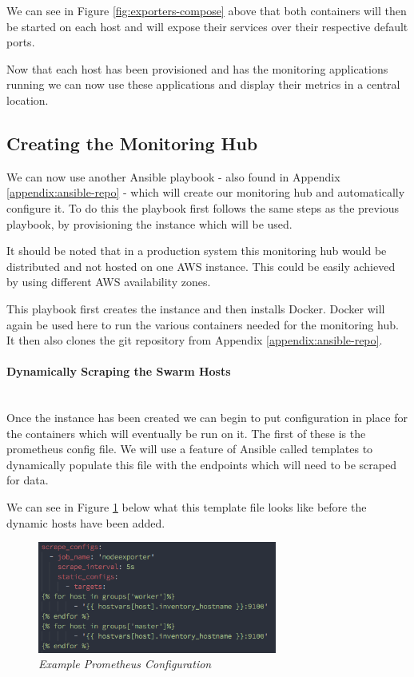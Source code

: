 We can see in Figure \ref{fig:exporters-compose} above that both containers will then be started on each host and will expose their services over their respective default ports.

Now that each host has been provisioned and has the monitoring applications running we can now use these applications and display their metrics in a central location.

\subsection{Creating the Monitoring Hub}
\label{sub:hub}
We can now use another Ansible playbook - also found in Appendix \ref{appendix:ansible-repo} - which will create our monitoring hub and automatically configure it. To do this the playbook first follows the same steps as the previous playbook, by provisioning the instance which will be used. 

It should be noted that in a production system this monitoring hub would be distributed and not hosted on one AWS instance. This could be easily achieved by using different AWS availability zones.

This playbook first creates the instance and then installs Docker. Docker will again be used here to run the various containers needed for the monitoring hub. It then also clones the git repository from Appendix \ref{appendix:ansible-repo}.

\paragraph{Dynamically Scraping the Swarm Hosts}\mbox{}\\
Once the instance has been created we can begin to put configuration in place for the containers which will eventually be run on it. The first of these is the prometheus config file. We will use a feature of Ansible called templates to dynamically populate this file with the endpoints which will need to be scraped for data.

We can see in Figure \ref{fig:prometheus-config} below what this template file looks like before the dynamic hosts have been added.

\begin{figure}[!h]
\centering
\includegraphics*[width=0.7\textwidth]{components/images/prometheus-config}
\caption{\em Example Prometheus Configuration}
\label{fig:prometheus-config}
\end{figure}

